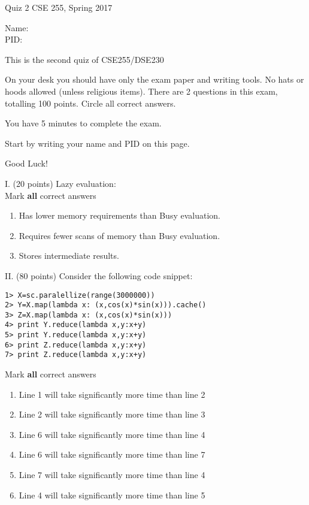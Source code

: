 \documentclass[11pt]{article}
\begin{document}
\setlength\parindent{0pt}
\thispagestyle{empty}

{\textbf \Large Quiz 2} \hfill CSE 255, Spring 2017
\\

\vspace{.1in}

Name: \underline{\hspace{3in}}
\\

PID: \underline{\hspace{3.15in}}

\vspace{.1in}

{\small \setlength\parindent{20pt}This is the second quiz of CSE255/DSE230

On your desk you should have only the exam paper and writing tools.
No hats or hoods allowed (unless religious items).
There are 2 questions in this exam, totalling 100 points.
Circle all correct answers.

You have 5 minutes to complete the exam.

Start by writing your name and PID on this page.

Good Luck!}

\vspace{.2in}
\noindent
I. (20 points)  Lazy evaluation: \\
Mark {\bf all} correct answers
\begin{enumerate}
\item Has lower memory requirements than Busy evaluation.
\item Requires fewer scans of memory than Busy evaluation.
\item Stores intermediate results.
\end{enumerate}


\vspace{.1in}
\noindent
II. (80 points) Consider the following code snippet:
\begin{verbatim}
1> X=sc.paralellize(range(3000000))
2> Y=X.map(lambda x: (x,cos(x)*sin(x))).cache()
3> Z=X.map(lambda x: (x,cos(x)*sin(x)))
4> print Y.reduce(lambda x,y:x+y)
5> print Y.reduce(lambda x,y:x+y)
6> print Z.reduce(lambda x,y:x+y)
7> print Z.reduce(lambda x,y:x+y)
\end{verbatim}
Mark {\bf all} correct answers
\begin{enumerate}
\item Line 1 will take significantly more time than line 2
\item Line 2 will take significantly more time than line 3
\item Line 6 will take significantly more time than line 4
\item Line 6 will take significantly more time than line 7
\item Line 7 will take significantly more time than line 4
\item Line 4 will take significantly more time than line 5
\end{enumerate}
\end{document}
